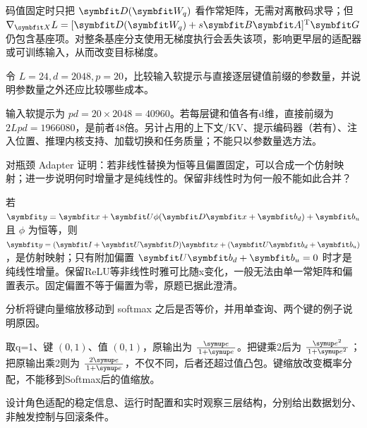 \begin{exercises}
\begin{exercise}
\begin{solution}
码值固定时只把 $\mat{D}(\mat{W}_q)$ 看作常矩阵，无需对离散码求导；但 $\nabla_{\mat{X}}L=[\mat{D}(\mat{W}_q)+s\mat{B}\mat{A}]^{\mathrm{T}}\mat{G}$ 仍包含基座项。对整条基座分支使用无梯度执行会丢失该项，影响更早层的适配器或可训练输入，从而改变目标梯度。
\end{solution}
\end{exercise}

\begin{exercise}\optional 令 $L=24,d=2048,p=20$，比较输入软提示与直接逐层键值前缀的参数量，并说明参数量之外还应比较哪些成本。

\begin{solution}
输入软提示为 $pd=20\times2048=40960$。若每层键和值各有d维，直接前缀为 $2Lpd=1966080$，是前者48倍。另计占用的上下文/KV、提示编码器（若有）、注入位置、推理内核支持、加载切换和任务质量；不能只以参数量选方法。
\end{solution}
\end{exercise}

\begin{exercise}\optional 对瓶颈 Adapter 证明：若非线性替换为恒等且偏置固定，可以合成一个仿射映射；进一步说明何时增量才是纯线性的。保留非线性时为何一般不能如此合并？

\begin{solution}
若 $\vect{y}=\vect{x}+\mat{U}\phi(\mat{D}\vect{x}+\vect{b}_d)+\vect{b}_u$ 且 $\phi$ 为恒等，则 $\vect{y}=(\mat{I}+\mat{U}\mat{D})\vect{x}+(\mat{U}\vect{b}_d+\vect{b}_u)$，是仿射映射；只有附加偏置 $\mat{U}\vect{b}_d+\vect{b}_u=0$ 时才是纯线性增量。保留ReLU等非线性时雅可比随x变化，一般无法由单一常矩阵和偏置表示。固定偏置不等于偏置为零，原题已据此澄清。
\end{solution}
\end{exercise}

\begin{exercise}\optional 分析将键向量缩放移动到 softmax 之后是否等价，并用单查询、两个键的例子说明原因。

\begin{solution}
取q=1、键 $(0,1)$、值 $(0,1)$，原输出为 $\frac{\conste}{1+\conste}$。把键乘2后为 $\frac{\conste{}^2}{1+\conste{}^2}$；把原输出乘2则为 $\frac{2\conste}{1+\conste}$，不仅不同，后者还超过值凸包。键缩放改变概率分配，不能移到Softmax后的值缩放。
\end{solution}
\end{exercise}

\begin{exercise}\optional 设计角色适配的稳定信息、运行时配置和实时观察三层结构，分别给出数据划分、非触发控制与回滚条件。


\end{exercise}
\end{exercises}
